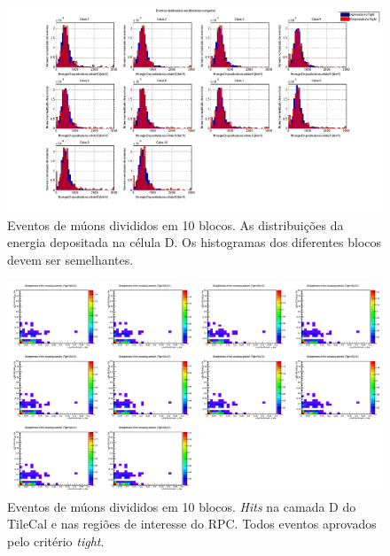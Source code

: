 \begin{figure}
    \centering
    \includegraphics[width=\textheight]{images/minbias/histClusters.png}
    \caption{Eventos de múons divididos em 10 blocos. As distribuições da
    energia depositada na célula D. Os histogramas dos diferentes blocos devem
    ser semelhantes.}
    \label{fig:blocominbias-1}
\end{figure}

\begin{figure}
    \centering
    \includegraphics[width=\textheight]{images/minbias/cluster_phi_eta_class.png}
    \caption{Eventos de múons divididos em 10 blocos. \emph{Hits} na camada D do
    TileCal e nas regiões de interesse do RPC. Todos eventos aprovados pelo
    critério \emph{tight}.}
    \label{fig:blocominbias-2}
\end{figure}

